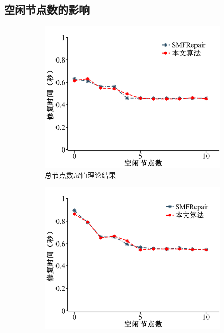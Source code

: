 \subsection{空闲节点数的影响}


\begin{figure}[htbp]
	\centering
	\begin{subfigure}[t]{0.4\textwidth}
		\centering
		\includegraphics[width=1\linewidth]{figures/3-15.pdf}
		\caption{总节点数$M$值理论结果}
		\label{fig:3-15}
	\end{subfigure}
	\begin{subfigure}[t]{0.4\textwidth}
		\centering
		\includegraphics[width=1\linewidth]{figures/3-16.pdf}

\end{subfigure}
\end{figure}
